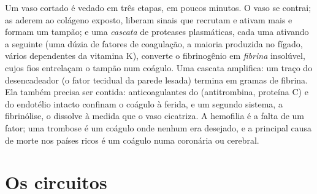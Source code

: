 \begin{proposition}[A hemostasia]\label{prop:b2:blood-circulation:clotting}
Um vaso cortado é vedado em três etapas, em poucos minutos. O vaso se
contrai; as  aderem ao colágeno exposto, liberam sinais que
recrutam e ativam mais  e formam um tampão; e uma
\emph{cascata} de proteases plasmáticas, cada uma ativando a seguinte
(uma dúzia de fatores de coagulação, a maioria produzida no fígado,
vários dependentes da vitamina K), converte o fibrinogênio em
\emph{fibrina} insolúvel, cujos fios entrelaçam o tampão num coágulo.
Uma cascata amplifica: um traço do desencadeador (o fator tecidual da
parede lesada) termina em gramas de fibrina. Ela também precisa ser
contida: anticoagulantes do  (antitrombina, proteína C) e do
endotélio intacto confinam o coágulo à ferida, e um segundo sistema, a
fibrinólise, o dissolve à medida que o vaso cicatriza. A hemofilia é a
falta de um fator; uma trombose é um coágulo onde nenhum era desejado,
e a principal causa de morte nos países ricos é um coágulo numa
 coronária ou cerebral.
\end{proposition}

\section{Os circuitos}

